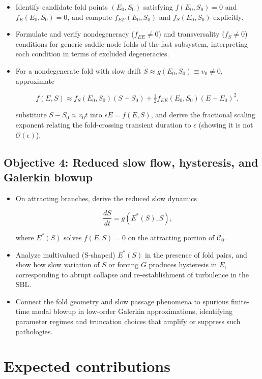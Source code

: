 \documentclass[11pt,fleqn]{article}
\begin{document}
\begin{itemize}
    \item Identify candidate fold points $(E_0,S_0)$ satisfying
    $f(E_0,S_0)=0$ and $f_E(E_0,S_0)=0$, and compute $f_{EE}(E_0,S_0)$ and
    $f_S(E_0,S_0)$ explicitly.
    \item Formulate and verify nondegeneracy ($f_{EE}\neq 0$) and transversality
    ($f_S\neq 0$) conditions for generic saddle-node folds of the fast
    subsystem, interpreting each condition in terms of excluded degeneracies.
    \item For a nondegenerate fold with slow drift
    $\dot S \approx g(E_0,S_0) \equiv v_0 \neq 0$, approximate


\[
    f(E,S) \approx f_S(E_0,S_0)(S - S_0) + \tfrac12 f_{EE}(E_0,S_0)(E-E_0)^2,
    \]


    substitute $S-S_0 \approx v_0 t$ into $\epsilon \dot E = f(E,S)$, and
    derive the fractional scaling exponent relating the fold-crossing transient
    duration to $\epsilon$ (showing it is not $\mathcal{O}(\epsilon)$).
\end{itemize}

\subsection{Objective 4: Reduced slow flow, hysteresis, and Galerkin blowup}

\begin{itemize}
    \item On attracting branches, derive the reduced slow dynamics


\[
    \frac{dS}{dt} = g(E^*(S), S),
    \]


    where $E^*(S)$ solves $f(E,S)=0$ on the attracting portion of
    $\mathcal{C}_0$.
    \item Analyze multivalued (S-shaped) $E^*(S)$ in the presence of fold pairs,
    and show how slow variation of $S$ or forcing $G$ produces hysteresis in
    $E$, corresponding to abrupt collapse and re-establishment of turbulence in
    the SBL.
    \item Connect the fold geometry and slow passage phenomena to spurious
    finite-time modal blowup in low-order Galerkin approximations, identifying
    parameter regimes and truncation choices that amplify or suppress such
    pathologies.
\end{itemize}

\section{Expected contributions}
\end{document}
